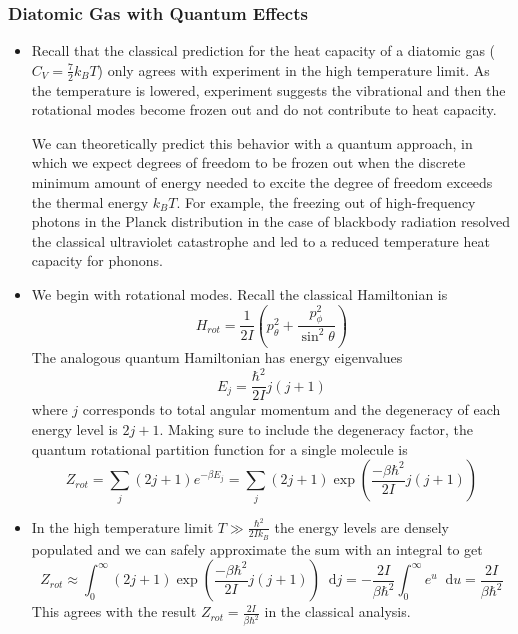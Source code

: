 \documentclass[11pt, a4paper]{article}
\newcommand{\diff}{\mathop{}\!\mathrm{d}} %
\begin{document}
\subsubsection{Diatomic Gas with Quantum Effects}
\begin{itemize}
	\item Recall that the classical prediction for the heat capacity of a diatomic gas ($ C_{V} = \frac{7}{2}k_{B}T $) only agrees with experiment in the high temperature limit. As the temperature is lowered, experiment suggests the vibrational and then the rotational modes become frozen out and do not contribute to heat capacity.
	
	We can theoretically predict this behavior with a quantum approach, in which we expect degrees of freedom to be frozen out when the discrete minimum amount of energy needed to excite the degree of freedom exceeds the thermal energy $ k_{B}T $. For example, the freezing out of high-frequency photons in the Planck distribution in the case of blackbody radiation resolved the classical ultraviolet catastrophe and led to a reduced temperature heat capacity for phonons.
	
	\item We begin with rotational modes. Recall the classical Hamiltonian is 
	\begin{equation*}
		H_{rot} = \frac{1}{2I} \left(p_{\theta}^{2} +  \frac{p_{\phi}^{2}}{\sin^{2}\theta}\right)
	\end{equation*}
	The analogous quantum Hamiltonian has energy eigenvalues
	\begin{equation*}
		E_{j} = \frac{\hbar^{2}}{2I}j(j+1)
	\end{equation*}
	where $ j $ corresponds to total angular momentum and the degeneracy of each energy level is $ 2j + 1 $. Making sure to include the degeneracy factor, the quantum rotational partition function for a single molecule is
	\begin{equation*}
		Z_{rot} = \sum_{j} (2j + 1)e^{-\beta E_{j}} =  \sum_{j} (2j + 1) \exp(\frac{-\beta\hbar^{2}}{2I}j(j+1))
	\end{equation*}
	
	\item In the high temperature limit $ T \gg \frac{\hbar^{2}}{2Ik_{B}} $ the energy levels are densely populated and we can safely approximate the sum with an integral to get
	\begin{equation*}
		Z_{rot} \approx \int_{0}^{\infty}(2j + 1) \exp(\frac{-\beta\hbar^{2}}{2I}j(j+1)) \diff j = - \frac{2I}{\beta\hbar^{2}} \int_{0}^{\infty} e^{u}\diff u=  \frac{2I}{\beta \hbar^{2}}
	\end{equation*}
	This agrees with the result $ Z_{rot} = \frac{2I}{\beta \hbar^{2}} $ in the classical analysis.
	

\end{itemize}
\end{document}
